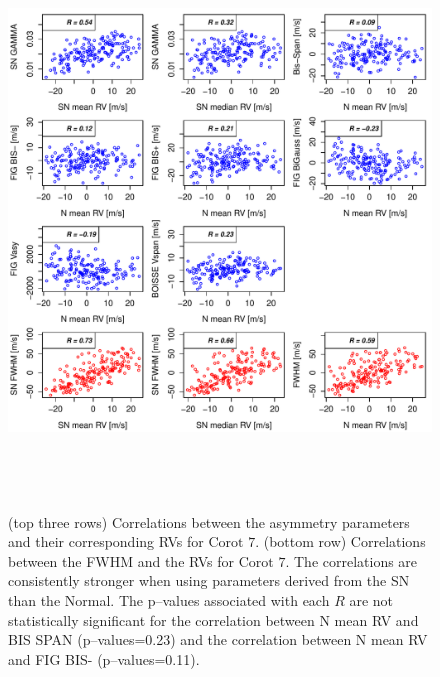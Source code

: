 \documentclass{aa}
\begin{document}
\begin{figure}[htbp]
\begin{center}
\includegraphics[height = 6in]{LRa01_E_[4]Comparison_para.pdf} 
   \caption{(top three rows) Correlations between the asymmetry parameters and their corresponding RVs for $\text{Corot }7$. 
(bottom row) Correlations between the FWHM and the RVs for $\text{Corot }7$.
The correlations are consistently stronger when using parameters derived from the SN than the Normal.
The p--values associated with each $R$ are not statistically significant for the correlation between N mean RV and BIS SPAN (p--values=0.23) and the correlation between N mean RV and FIG BIS- (p--values=0.11).}
   \label{fig:Corot7:corrPlot}
\end{center}
\end{figure}
\end{document}
